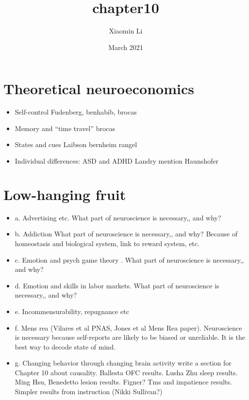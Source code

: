 \documentclass{article}
\title{chapter10}
\author{Xiaomin Li}
\date{March 2021}
\begin{document}
\maketitle
\section{Theoretical neuroeconomics}
\begin{itemize}
	\item 	Self-control
		Fudenberg, benhabib, brocas
	\item Memory and “time travel”
		brocas
	\item States and cues
		Laibson bernheim rangel 
	\item Individual differences: ASD and ADHD
		Landry  mention Haunshofer
\end{itemize}



\section{Low-hanging fruit}
\begin{itemize}
	\item a.	Advertising etc. What part of neuroscience is necessary,, and why? 
	\item b.	Addiction What part of neuroscience is necessary,, and why?  Because of homeostasis and biological system, link to reward system, etc. 
\item c.	Emotion and psych game theory . What part of neuroscience is necessary,, and why? 
\item  d.	Emotion and skills in labor markets. What part of neuroscience is necessary,, and why? 
\item e.	Incommensurability, repugnance etc 
\item f.	Mens rea (Vilares et al PNAS, Jones et al Mens Rea paper). Neuroscience is necessary because self-reports are likely to be biased or unreliable. It is the best way to decode state of mind. 
\item g.	Changing behavior through changing brain activity  write a  section for Chapter 10 about causality. Ballesta OFC results.  Lusha Zhu sleep results.  Ming Hsu, Benedetto lesion results.  Figner? Tms and impatience results.  Simpler results from instruction (Nikki Sullivan?)
\end{itemize}
\end{document}
